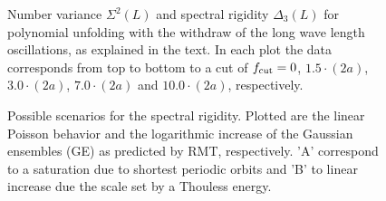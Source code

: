 \begin{figure}
\begin{minipage}{7.5cm}
\centerline{}
\end{minipage}
\hfill
\begin{minipage}{7.5cm}
\centerline{}
\end{minipage}
\caption{Number variance $\Sigma^2(L)$ and
  spectral rigidity $\Delta_3(L)$ for polynomial unfolding with the
  withdraw of the long wave length oscillations, as explained in the
  text. In each plot the data corresponds from top to bottom to a cut
  of $f_{\rm cut}=0$, $1.5\cdot(2a)$, $3.0\cdot(2a)$, $7.0\cdot(2a)$
  and $10.0\cdot(2a)$, respectively.
  \label{poly_cut}}
\end{figure}

\begin{figure}
\centerline{}
\caption{Possible scenarios for the spectral rigidity. Plotted are
  the linear Poisson behavior and the logarithmic increase of the
  Gaussian ensembles (GE) as predicted by RMT, respectively. 'A'
  correspond to a saturation due to shortest periodic orbits and 'B'
  to linear increase due the scale set by a Thouless energy.
  \label{cartoon}}
\end{figure}




